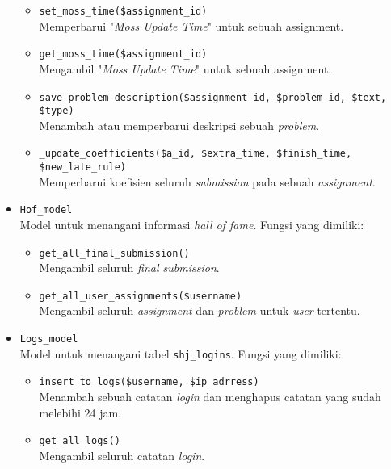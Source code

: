 \begin{itemize}
\begin{itemize}
		\item \verb|set_moss_time($assignment_id)| \\ Memperbarui "\textit{Moss Update Time}" untuk sebuah assignment.
		\item \verb|get_moss_time($assignment_id)| \\ Mengambil "\textit{Moss Update Time}" untuk sebuah assignment.
		\item \verb|save_problem_description($assignment_id, $problem_id, $text, $type)| \\ Menambah atau memperbarui deskripsi sebuah \textit{problem}.
		\item \verb|_update_coefficients($a_id, $extra_time, $finish_time, $new_late_rule)| \\ Memperbarui koefisien seluruh \textit{submission} pada sebuah \textit{assignment}.
	\end{itemize}
	
	\item \verb|Hof_model| \\ Model untuk menangani informasi \textit{hall of fame}. Fungsi yang dimiliki:
	\begin{itemize}
	    \item \verb|get_all_final_submission()| \\ Mengambil seluruh \textit{final submission}.
	    \item \verb|get_all_user_assignments($username)| \\ Mengambil seluruh \textit{assignment} dan \textit{problem} untuk \textit{user} tertentu.
	\end{itemize}
	
	\item \verb|Logs_model| \\ Model untuk menangani tabel \verb|shj_logins|. Fungsi yang dimiliki:
	\begin{itemize}
	    \item \verb|insert_to_logs($username, $ip_adrress)| \\ Menambah sebuah catatan \textit{login} dan menghapus catatan yang sudah melebihi 24 jam.
	    \item \verb|get_all_logs()| \\ Mengambil seluruh catatan \textit{login}.
	\end{itemize}
	

\end{itemize}
